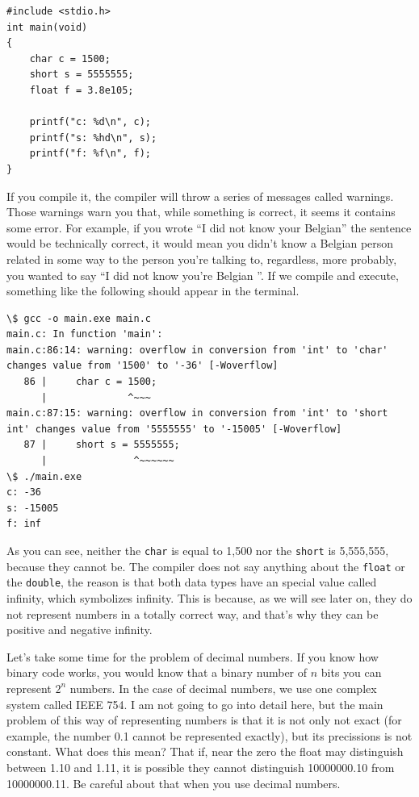 \documentclass[a4paper]{article}
\begin{document}
\noindent
\begin{minipage}[H]{\linewidth}
\mbox{}
\begin{lstlisting}[style=C, caption={Erroneous assignments},
label={lst:invalidAssignations}]
#include <stdio.h>
int main(void)
{
    char c = 1500;
    short s = 5555555;
    float f = 3.8e105;

    printf("c: %d\n", c);
    printf("s: %hd\n", s);
    printf("f: %f\n", f);
}
\end{lstlisting}
\end{minipage}

If you compile it, the compiler will throw a series of messages called warnings.
Those warnings warn you that, while something is correct, it seems it contains
some error. For example, if you wrote ``I did not know your Belgian'' the
sentence would be technically correct, it would mean you didn't know a Belgian
person related in some way to the person you're talking to, regardless, more
probably, you wanted to say  ``I did not know you're Belgian ''. If we compile
and execute, something like the following should appear in the terminal.

\noindent
\begin{minipage}[H]{\linewidth}
\mbox{}
\begin{lstlisting}[style=terminalStyle]
\$ gcc -o main.exe main.c
main.c: In function 'main':
main.c:86:14: warning: overflow in conversion from 'int' to 'char' changes value from '1500' to '-36' [-Woverflow]
   86 |     char c = 1500;
      |              ^~~~
main.c:87:15: warning: overflow in conversion from 'int' to 'short int' changes value from '5555555' to '-15005' [-Woverflow]
   87 |     short s = 5555555;
      |               ^~~~~~~
\$ ./main.exe
c: -36
s: -15005
f: inf
\end{lstlisting}
\end{minipage}

As you can see, neither the \texttt{char} is equal to 1,500 nor the
\texttt{short} is 5,555,555, because they cannot be. The compiler does not say
anything about the \texttt{float} or the \texttt{double}, the reason is that both
data types have an special value called infinity, which symbolizes infinity.
This is because, as we will see later on, they do not represent numbers in a
totally correct way, and that's why they can be positive and negative infinity.

Let's take some time for the problem of decimal numbers. If you know how binary
code works, you would know that a binary number of $n$ bits you can represent
$2^n$ numbers. In the case of decimal numbers, we use one complex system called
IEEE  754. I am not going to go into detail here, but the main problem of this
way of representing numbers is that it is not only not exact (for example,
the number 0.1 cannot be represented exactly), but its precissions is not
constant. What does this mean? That if, near the zero the float may distinguish
between 1.10 and 1.11, it is possible they cannot distinguish 10000000.10 from
10000000.11. Be careful about that when you use decimal numbers.
\end{document}

